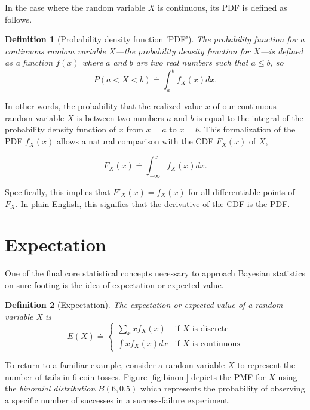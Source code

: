 \documentclass[
  12pt,
]{book}
\theoremstyle{definition}
\newtheorem{definition}{Definition}[chapter]
\theoremstyle{definition}
\theoremstyle{definition}
\theoremstyle{remark}
\begin{document}
In the case where the random variable \(X\) is continuous, its PDF is defined as follows.

\begin{definition}[Probability density function 'PDF']
\protect\hypertarget{def:pdf}{}{\label{def:pdf} {} }\emph{The probability function for a continuous random variable \(X\)---the probability density function for \(X\)---is defined as a function \(f(x)\) where \(a\) and \(b\) are two real numbers such that \(a ≤ b\), so}
\[P(a<X<b) \doteq \int_{a}^{b}f_X(x)dx.\]
\end{definition}

In other words, the probability that the realized value \(x\) of our continuous random variable \(X\) is between two numbers \(a\) and \(b\) is equal to the integral of the probability density function of \(x\) from \(x = a\) to \(x = b\).
This formalization of the PDF \(f_X(x)\) allows a natural comparison with the CDF \(F_X(x)\) of \(X\),

\[F_X(x) \doteq \int_{-\infty}^{x}f_X(x)dx.\]

Specifically, this implies that \(F'_X(x)=f_X(x)\) for all differentiable points of \(F_X\).
In plain English, this signifies that the derivative of the CDF is the PDF.

\hypertarget{expectation}{%
\section{Expectation}\label{expectation}}

One of the final core statistical concepts necessary to approach Bayesian statistics on sure footing is the idea of expectation or expected value.

\begin{definition}[Expectation]
\protect\hypertarget{def:e}{}{\label{def:e} {} }\emph{The expectation or expected value of a random variable X is}
\[E(X) \doteq \begin{cases}\sum_{x}xf_{X}(x) & \textrm{if }X\textrm{ is discrete}\\\int{xf_{X}(x)dx} & \textrm{if }X\textrm{ is continuous}\end{cases}\]
\end{definition}

To return to a familiar example, consider a random variable \(X\) to represent the number of tails in 6 coin tosses. Figure \ref{fig:binom} depicts the PMF for \(X\) using the \emph{binomial distribution} \(B(6,0.5)\) which represents the probability of observing a specific number of successes in a success-failure experiment.
\end{document}
